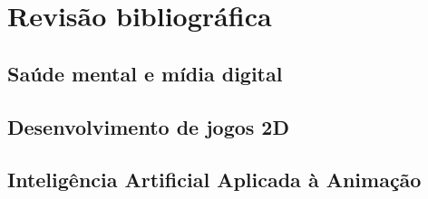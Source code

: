\chapter{Revisão bibliográfica}
\label{c.revisao}

\section{Saúde mental e mídia digital}
\label{s.saudeMental}


\section{Desenvolvimento de jogos 2D}
\label{s.jogos2D}


\section{Inteligência Artificial Aplicada à Animação}
\label{s.IAanimação}



